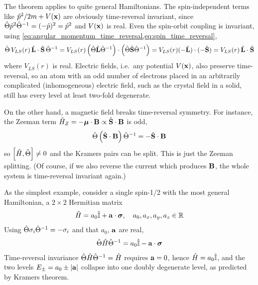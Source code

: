 The theorem applies to quite general Hamiltonians. The spin-independent terms like $\hat{p}^2/2m + V(\mathbf{x})$ are obviously time-reversal invariant, since $\hat{\Theta} \hat{p}^2 \hat{\Theta}^{-1} = (-\hat{p})^2 = \hat{p}^2$ and $V(\mathbf{x})$ is real. Even the spin-orbit coupling is invariant, using \cref{eq:angular_momentum_time_reversal,eq:spin_time_reversal},
\begin{align*}
    \hat{\Theta} \, V_{LS}(r) \, \hat{\mathbf{L}} \cdot \hat{\mathbf{S}} \, \hat{\Theta}^{-1} = V_{LS}(r) \left( \hat{\Theta} \hat{\mathbf{L}} \hat{\Theta}^{-1} \right) \cdot \left( \hat{\Theta} \hat{\mathbf{S}} \hat{\Theta}^{-1} \right) = V_{LS}(r) (- \hat{\mathbf{L}}) \cdot (- \hat{\mathbf{S}}) = V_{LS}(r) \, \hat{\mathbf{L}} \cdot \hat{\mathbf{S}}
\end{align*}
where $V_{LS}(r)$ is real. Electric fields, i.e.\ any potential $V(\mathbf{x})$, also preserve time-reversal, so an atom with an odd number of electrons placed in an arbitrarily complicated (inhomogeneous) electric field, such as the crystal field in a solid, still has every level at least two-fold degenerate.

On the other hand, a magnetic field breaks time-reversal symmetry. For instance, the Zeeman term $\hat{H}_Z = - \boldsymbol{\mu} \cdot \mathbf{B} \propto \hat{\mathbf{S}} \cdot \mathbf{B}$ is odd,
\begin{align*}
    \hat{\Theta} \left( \hat{\mathbf{S}} \cdot \mathbf{B} \right) \hat{\Theta}^{-1} = - \hat{\mathbf{S}} \cdot \mathbf{B}
\end{align*}
so $\left[ \hat{H} , \hat{\Theta} \right] \neq 0$ and the Kramers pairs can be split. This is just the Zeeman splitting. (Of course, if we also reverse the current which produces $\mathbf{B}$, the whole system is time-reversal invariant again.)

As the simplest example, consider a single spin-1/2 with the most general Hamiltonian, a $2 \times 2$ Hermitian matrix
\begin{align*}
    \hat{H} = a_0 \hat{\mathbb{I}} + \mathbf{a} \cdot \boldsymbol{\sigma}, \quad a_0, a_x, a_y, a_z \in \mathbb{R}
\end{align*}
Using $\hat{\Theta} \sigma_i \hat{\Theta}^{-1} = - \sigma_i$ and that $a_0$, $\mathbf{a}$ are real,
\begin{align*}
    \hat{\Theta} \hat{H} \hat{\Theta}^{-1} = a_0 \hat{\mathbb{I}} - \mathbf{a} \cdot \boldsymbol{\sigma}
\end{align*}
Time-reversal invariance $\hat{\Theta} \hat{H} \hat{\Theta}^{-1} = \hat{H}$ requires $\mathbf{a} = 0$, hence $\hat{H} = a_0 \hat{\mathbb{I}}$, and the two levels $E_\pm = a_0 \pm \left| \mathbf{a} \right|$ collapse into one doubly degenerate level, as predicted by Kramers theorem.

